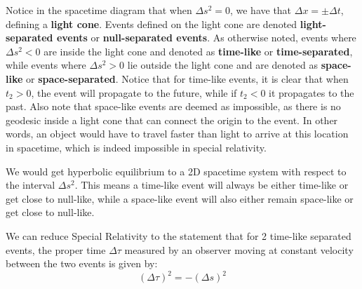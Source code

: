 \documentclass{article}
\begin{document}
 		Notice in the spacetime diagram that when $\Delta s^2 = 0$, we have that $\Delta x = \pm \Delta t$, defining a \textbf{light cone}. Events defined on the light cone are denoted \textbf{light-separated events} or \textbf{null-separated events}. As otherwise noted, events where $\Delta s^2 < 0 $ are inside the light cone and denoted as \textbf{time-like} or \textbf{time-separated}, while events where $\Delta s^2 > 0$ lie outside the light cone and are denoted as \textbf{space-like} or \textbf{space-separated}. Notice that for time-like events, it is clear that when $t_2 > 0$, the event will propagate to the future, while if $t_2 < 0$ it propagates to the past. Also note that space-like events are deemed as impossible, as there is no geodesic inside a light cone that can connect the origin to the event. In other words, an object would have to travel faster than light to arrive at this location in spacetime, which is indeed impossible in special relativity.
 		
 		We would get hyperbolic equilibrium to a 2D spacetime system with respect to the interval $\Delta s^2$. This means a time-like event will always be either time-like or get close to null-like, while a space-like event will also either remain space-like or get close to null-like. 
 	\pagebreak
 		\begin{claim}
 			We can reduce Special Relativity to the statement that for 2 time-like separated events, the proper time $\Delta \tau$ measured by an observer moving at constant velocity between the two events is given by:
 			$$ \left( \Delta \tau \right)^2  = - \left( \Delta s \right)^2$$
 		\end{claim}
 		
\end{document}
